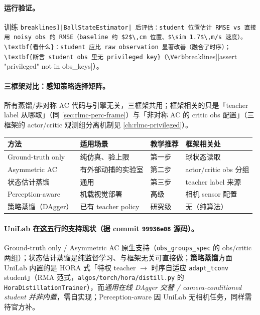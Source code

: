 \paragraph{运行验证。}训练 \Verb[breaklines]|BallStateEstimator| 后评估：student 位置估计 RMSE vs 直接用 noisy obs 的 RMSE（baseline 约 $2$\,cm 位置、$\sim 1.7$\,m/s 速度）。\textbf{看什么}：student 应比 raw observation 显著改善（融合了时序）；\textbf{断言 student obs 里无 privileged key}（\Verb[breaklines]|assert "privileged" not in obs_keys|）。

\paragraph{三框架对比：感知策略选择矩阵。}所有蒸馏/非对称 AC 代码与引擎无关，三框架共用；框架相关的只是「teacher label 从哪取」（同 \cref{sec:rlmc-perc-frame}）与「非对称 AC 的 critic obs 配置」（三框架的 actor/critic 观测组分离机制见 \cref{ch:rlmc-privileged}）。

\begin{center}
\small
\begin{tabular}{@{}llll@{}}
\toprule
方法 & 适用场景 & 教学推荐 & 框架相关处 \\
\midrule
Ground-truth only & 纯仿真、验上限 & 第一步 & 球状态读取 \\
Asymmetric AC & 有外部动捕的实验室 & 第二步 & actor/critic obs 分组 \\
状态估计蒸馏 & 通用 & 第三步 & teacher label 来源 \\
Perception-aware & 机载视觉部署 & 高级 & 相机 sensor 配置 \\
策略蒸馏（DAgger） & 已有 teacher policy & 研究级 & 无（纯算法） \\
\bottomrule
\end{tabular}
\end{center}

\paragraph{UniLab 在这五行的支持现状（据 commit \texttt{99936e08} 源码）。}Ground-truth only / Asymmetric AC 原生支持（\texttt{obs\_groups\_spec} 的 obs/critic 两组）；状态估计蒸馏是纯监督学习、与框架无关可直接做；\textbf{策略蒸馏}方面 UniLab 内置的是 HORA 式「特权 teacher $\to$ 时序自适应 \texttt{adapt\_tconv} student」（RMA 范式，\texttt{algos/\allowbreak torch/\allowbreak hora/\allowbreak distill.\allowbreak py} 的 \texttt{HoraDistillationTrainer}），而\emph{通用在线 DAgger 交替 / camera-conditioned student 并非内置}，需自实现；Perception-aware 因 UniLab 无相机任务，同样需待官方补。

